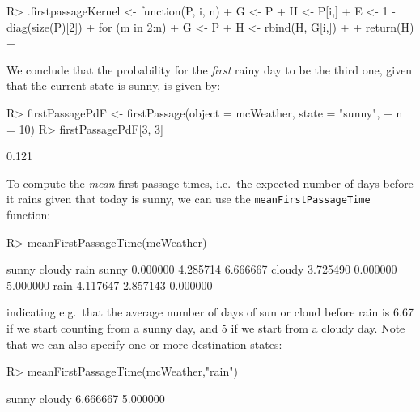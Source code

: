 \documentclass[
  nojss]{jss}
\begin{document}
\begin{CodeChunk}
\begin{CodeInput}
R> .firstpassageKernel <- function(P, i, n){
+   G <- P
+   H <- P[i,]
+   E <- 1 - diag(size(P)[2])
+   for (m in 2:n) {
+     G <- P %
+     H <- rbind(H, G[i,])
+   }
+   return(H)
+ }
\end{CodeInput}
\end{CodeChunk}

We conclude that the probability for the \emph{first} rainy day to be the third one, given that the current state is sunny, is given by:

\begin{CodeChunk}
\begin{CodeInput}
R> firstPassagePdF <- firstPassage(object = mcWeather, state = "sunny", 
+                                 n = 10)
R> firstPassagePdF[3, 3]
\end{CodeInput}
\begin{CodeOutput}
[1] 0.121
\end{CodeOutput}
\end{CodeChunk}

To compute the \emph{mean} first passage times, i.e.~the expected number of days before it rains
given that today is sunny, we can use the \texttt{meanFirstPassageTime} function:

\begin{CodeChunk}
\begin{CodeInput}
R> meanFirstPassageTime(mcWeather)
\end{CodeInput}
\begin{CodeOutput}
          sunny   cloudy     rain
sunny  0.000000 4.285714 6.666667
cloudy 3.725490 0.000000 5.000000
rain   4.117647 2.857143 0.000000
\end{CodeOutput}
\end{CodeChunk}

indicating e.g.~that the average number of days of sun or cloud before rain is 6.67 if we start
counting from a sunny day, and 5 if we start from a cloudy day. Note that
we can also specify one or more destination states:

\begin{CodeChunk}
\begin{CodeInput}
R> meanFirstPassageTime(mcWeather,"rain")
\end{CodeInput}
\begin{CodeOutput}
   sunny   cloudy 
6.666667 5.000000 
\end{CodeOutput}
\end{CodeChunk}
\end{document}
